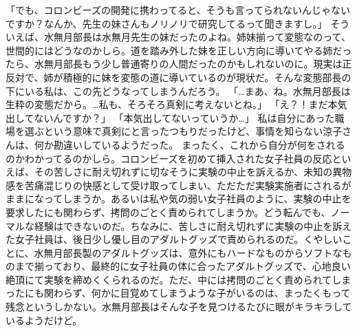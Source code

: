 「でも、コロンビーズの開発に携わってると、そうも言ってられないんじゃないですか？なんか、先生の妹さんもノリノリで研究してるって聞きますし。」
そういえば、水無月部長は水無月先生の妹だったのよね。姉妹揃って変態なのって、世間的にはどうなのかしら。道を踏み外した妹を正しい方向に導いてやる姉だったら、水無月部長もう少し普通寄りの人間だったのかもしれないのに。現実は正反対で、姉が積極的に妹を変態の道に導いているのが現状だ。そんな変態部長の下にいる私は、この先どうなってしまうんだろう。
「…まあ、ね。水無月部長は生粋の変態だから。…私も、そろそろ真剣に考えないとね。」
「え？！まだ本気出してないんですか？」
「本気出してないっていうか…」
私は自分にあった職場を選ぶという意味で真剣にと言ったつもりだったけど、事情を知らない涼子さんは、何か勘違いしているようだった。
まったく、これから自分が何をされるのかわかってるのかしら。コロンビーズを初めて挿入された女子社員の反応といえば、その苦しさに耐え切れずに切なそうに実験の中止を訴えるか、未知の異物感を苦痛混じりの快感として受け取ってしまい、ただただ実験実施者にされるがままになってしまうか。あるいは私や気の弱い女子社員のように、実験の中止を要求したにも関わらず、拷問のごとく責められてしまうか。どう転んでも、ノーマルな経験はできないのだ。ちなみに、苦しさに耐え切れずに実験の中止を訴えた女子社員は、後日少し優し目のアダルトグッズで責められるのだ。くやしいことに、水無月部長製のアダルトグッズは、意外にもハードなものからソフトなものまで揃っており、最終的に女子社員の体に合ったアダルトグッズで、心地良い絶頂にて実験を締めくくられるのだ。ただ、中には拷問のごとく責められてしまったにも関わらず、何かに目覚めてしまうような子がいるのは、まったくもって残念というしかない。水無月部長はそんな子を見つけるたびに眼がキラキラしているようだけど。

